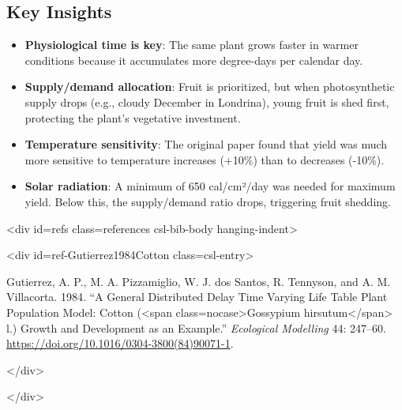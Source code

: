 \subsection{Key Insights}



\label{7549919537174593161}{}


\begin{itemize}
\item[1. ] \textbf{Physiological time is key}: The same plant grows faster in warmer  conditions because it accumulates more degree-days per calendar day.


\item[2. ] \textbf{Supply/demand allocation}: Fruit is prioritized, but when  photosynthetic supply drops (e.g., cloudy December in Londrina),  young fruit is shed first, protecting the plant’s vegetative  investment.


\item[3. ] \textbf{Temperature sensitivity}: The original paper found that yield was  much more sensitive to temperature increases (+10\%) than to  decreases (-10\%).


\item[4. ] \textbf{Solar radiation}: A minimum of 650 cal/cm²/day was needed for  maximum yield. Below this, the supply/demand ratio drops, triggering  fruit shedding.

\end{itemize}


<div id={\textquotedbl}refs{\textquotedbl} class={\textquotedbl}references csl-bib-body hanging-indent{\textquotedbl}>



<div id={\textquotedbl}ref-Gutierrez1984Cotton{\textquotedbl} class={\textquotedbl}csl-entry{\textquotedbl}>



Gutierrez, A. P., M. A. Pizzamiglio, W. J. dos Santos, R. Tennyson, and A. M. Villacorta. 1984. “A General Distributed Delay Time Varying Life Table Plant Population Model: Cotton (<span class={\textquotedbl}nocase{\textquotedbl}>Gossypium hirsutum</span> l.) Growth and Development as an Example.” \emph{Ecological Modelling} 44: 247–60. \href{https://doi.org/10.1016/0304-3800(84)90071-1}{https://doi.org/10.1016/0304-3800(84)90071-1}.



</div>



</div>



